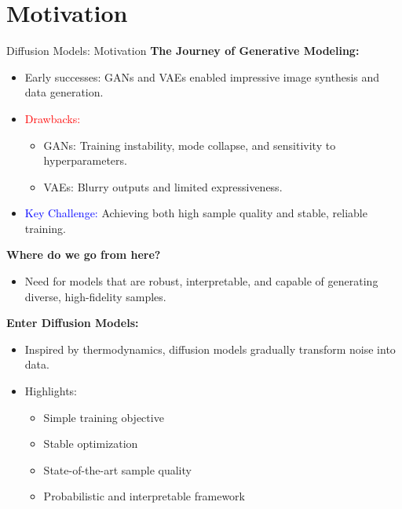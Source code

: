 \section{Motivation}
\begin{frame}[allowframebreaks]{Diffusion Models: Motivation}
    \textbf{The Journey of Generative Modeling:}
    \begin{itemize}
        \item Early successes: GANs and VAEs enabled impressive image synthesis and data generation.
        \item \textcolor{red}{Drawbacks:} 
        \begin{itemize}
            \item GANs: Training instability, mode collapse, and sensitivity to hyperparameters.
            \item VAEs: Blurry outputs and limited expressiveness.
        \end{itemize}
        \item \textcolor{blue}{Key Challenge:} Achieving both high sample quality and stable, reliable training.
    \end{itemize}

\framebreak

    \textbf{Where do we go from here?}
    \begin{itemize}
        \item Need for models that are robust, interpretable, and capable of generating diverse, high-fidelity samples.
    \end{itemize}

\framebreak

    \textbf{Enter Diffusion Models:}
    \begin{itemize}
        \item Inspired by thermodynamics, diffusion models gradually transform noise into data.
        \item \textcolor[rgb]{0,0.6,0}{Highlights:} 
        \begin{itemize}
            \item Simple training objective
            \item Stable optimization
            \item State-of-the-art sample quality
            \item Probabilistic and interpretable framework
        \end{itemize}
    \end{itemize}
\end{frame}

\begin{frame}[allowframebreaks]{}
    \begin{figure}
        \centering
    \end{figure}
\end{frame}